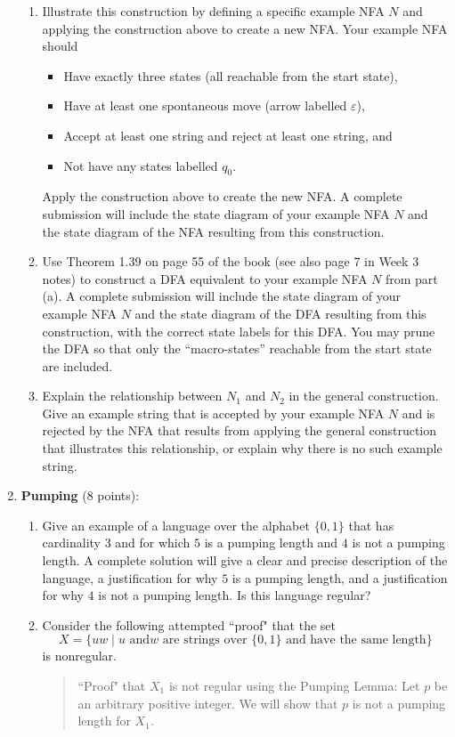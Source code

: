 \begin{enumerate}[wide, labelwidth=!, labelindent=0pt]
\begin{enumerate}
\item\gradeCorrect Illustrate this construction by defining a specific example NFA $N$ and applying the 
construction above to create a new NFA. Your example NFA should
\begin{itemize}
    \item Have exactly three states (all reachable from the start state),
    \item Have at least one spontaneous move (arrow labelled $\varepsilon$),
    \item Accept at least one string and reject at least one string, and
    \item Not have any states labelled $q_0$.
\end{itemize}
Apply the construction above to create the new NFA. A complete submission 
will include the state diagram of your example NFA $N$ and the state diagram of the NFA resulting 
from this construction.
\item\gradeCorrect Use Theorem 1.39 on page 55 of the book (see also page 7 in Week 3 notes) to construct a 
DFA equivalent to your example NFA $N$ from part (a).
A complete submission 
will include the state diagram of your example NFA $N$ and the state diagram of the DFA resulting 
from this construction, with the correct state labels for this DFA. You may prune the DFA so that only the ``macro-states''
reachable from the start state are included.
\item \gradeComplete Explain the relationship between $N_1$ and $N_2$ in the general construction.
Give an example string that is accepted by your example NFA $N$ and is rejected by the NFA that results from 
applying the general construction that illustrates this relationship, or explain why there is no such example string.

\end{enumerate}


\item \textbf{Pumping} (8 points):

\begin{enumerate}
\item\gradeCorrect Give an example of a language
over the alphabet $\{0,1\}$ that has cardinality $3$ and for which $5$ is a pumping length
and $4$ is not a pumping length.  A complete solution will give a clear and precise
description of the language, a justification for why $5$ is a pumping length, and a 
justification for why $4$ is not a pumping length. Is this language regular?
\item\gradeComplete Consider the following attempted ``proof" that the set 
$$X = \{ uw \mid \text{$u$ and
$w$ are strings over $\{0,1\}$ and have the same length} \}$$
is nonregular.
\begin{quote}
``Proof" that $X_1$ is not regular using the Pumping Lemma: Let $p$ be 
an arbitrary positive integer. We will show that $p$ is not a pumping length for $X_1$. 


\end{quote}
\end{enumerate}
\end{enumerate}
